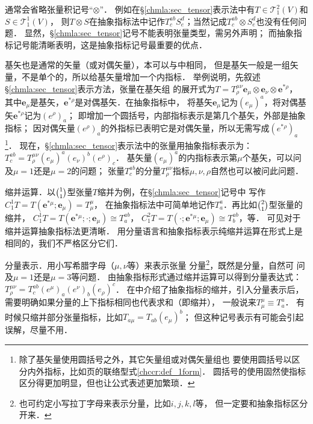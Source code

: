  通常会省略张量积记号“$\otimes$”．
例如在\S \ref{chmla:sec_tensor}表示法中有$T\in \mathcal{T}^{2}_{1}(V)$和$S\in \mathcal{T}^{1}_{1}(V)$，
则$T\otimes S$在抽象指标法中记作$T^{ab}_c S^d_e$；当然记成$T^{ab}_c\otimes S^d_e$也没有任何问题．
显然，\S \ref{chmla:sec_tensor}记号{\heiti 不能}表明张量类型，需另外声明；
而抽象指标记号{\heiti 能}清晰表明，这是抽象指标记号最重要的优点．


 基矢也是通常的矢量（或对偶矢量），本可以与中相同，
但是基矢一般是一组矢量，不是单个的，所以给基矢量增加一个内指标．
举例说明，先叙述\S \ref{chmla:sec_tensor}表示方法，张量在基矢组
的展开式为$T=T^{\mu\nu}_{\rho} \boldsymbol{e}_\mu \otimes \boldsymbol{e}_\nu \otimes \boldsymbol{e}^{*\rho}$，
其中$\boldsymbol{e}_\mu$是基矢，$\boldsymbol{e}^{*\rho}$是对偶基矢．在抽象指标中，
将基矢$\boldsymbol{e}_\mu$记为$(e_\mu)^a$，将对偶基矢$\boldsymbol{e}^{*\rho }$记为$(e^{\rho})_a$；
即增加一个圆括号，内部指标表示是第几个基矢，外部是抽象指标；
因对偶矢量$(e^{\rho})_a$的外指标已表明它是对偶矢量，所以无需写成$(e^{*\rho})_a$
{\footnote{除了基矢量使用圆括号之外，其它矢量{\kaishu 组}或对偶矢量{\kaishu 组}也
        要使用圆括号以区分内外指标，比如\pageref{chccr:def_1form}页的联络型式\eqref{chccr:def_1form}．
        圆括号的使用固然使指标区分得更加明显，但也让公式表述更加繁琐．}}．
现在，\S \ref{chmla:sec_tensor}表示法中的张量用抽象指标表示为：
$    T^{ab}_c = T^{\mu\nu}_{\rho} (e_\mu)^a (e_\nu)^b (e^{\rho})_c $．
基矢量$(e_\mu)^a$的内指标表示第$\mu$个基矢，可以问及$\mu=1$还是$\mu=2$的问题；
张量$T^{ab}_c$的分量$T^{\mu\nu}_{\rho}$指标$\mu,\nu,\rho$自然也可以被问此问题．

 缩并运算．以$\binom{1}{1}$型张量$T$缩并为例，在\S\ref{chmla:sec_tensor}记号中
写作$C^1_1 T=T(\boldsymbol{e}^{*\mu};\boldsymbol{e}_\mu)=T^\mu _\mu$，
在抽象指标法中可简单地记作$T^a_{a}$．再比如$\binom{2}{1}$型张量的缩并，
$C^1_1 T=T(\boldsymbol{e}^{*\mu};\cdot;\boldsymbol{e}_\mu)\cong T^{ab}_a$，
$C^2_1 T=T(\cdot;\boldsymbol{e}^{*\mu};\boldsymbol{e}_\mu)\cong T^{ab}_b$，等．
可见对于缩并运算抽象指标法更清晰．
用分量语言和抽象指标表示纯缩并运算在形式上是相同的，我们不严格区分它们．

 分量表示．用小写希腊字母（$\mu,\nu$等）来表示张量
分量{\footnote{也可约定小写拉丁字母来表示分量，比如$i,j,k,l$等，
        但一定要和抽象指标区分开来．}}，既然是分量，自然可
问及$\mu=1$还是$\mu=3$等问题．
由抽象指标形式通过缩并运算可以得到分量表达式：
$    T^{\mu\nu}_{\rho} = T^{ab}_c (e^\mu)_a (e^\nu)_b (e_{\rho})^c $．
在中介绍了抽象指标的缩并，引入分量表示后，
需要明确如果分量的上下指标相同也代表求和（即缩并），
一般说来$T^\mu _\mu \equiv T^a _a$．
有时候只缩并部分张量指标，比如$T_{a\mu}=T_{ab}(e_\mu)^b$；
但这种记号表示有可能会引起误解，尽量不用．


